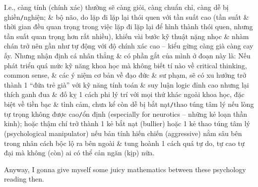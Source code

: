 \documentclass[12pt,oneside]{book}
\begin{document}
I.e., càng tính (chính xác) thường sẽ càng giỏi, càng chuẩn chỉ, càng dễ bị ghiền{\tt/}nghiện; \& bộ não, do lặp đi lặp lại thói quen với tần suất cao (tần suất \& thời gian đều quan trọng trong việc lặp đi lặp lại để hình thành thói quen, nhưng tần suất quan trọng hơn rất nhiều), khiến vài bước kỹ thuật nặng nhọc \& nhàm chán trở nên gần như tự động với độ chính xác cao -- kiểu gừng càng già càng cay ấy. Nhưng nhận định cá nhân thẳng \& có phần gắt của mình ở đoạn này là: Nếu phát triển quá mức kỹ năng khoa học mà không biết tí nào về critical thinking, common sense, \& các ý niệm cơ bản về đạo đức \& sư phạm, sẽ có xu hướng trở thành 1 ``đứa trẻ già'' với kỹ năng tính toán \& suy luận logic đỉnh cao nhưng lại thích ganh đua \& đố kỵ 1 cách phi lý trí với mọi thứ khác ngoài khoa học, đặc biệt về tiền bạc \& tình cảm, chưa kể còn dễ bị bắt nạt{\tt/}thao túng tâm lý nếu lòng tự trọng không được cao{\tt/}ổn định (especially for neurotics -- những kẻ loạn thần kinh); hoặc thậm chí trở thành 1 kẻ bắt nạt (bullier) hoặc 1 kẻ thao túng tâm lý (psychological manipulator) nếu bản tính hiến chiến (aggressive) nằm sâu bên trong nhân cách bộc lộ ra bên ngoài \& tung hoành 1 cách quá tự do, tự cao tự đại mà không (còn) ai có thể cản ngăn (kịp) nữa.

Anyway, I gonna give myself some juicy mathematics between these psychology reading then.
\end{document}
